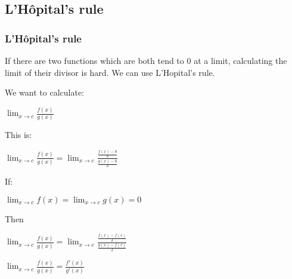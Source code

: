
\subsection{L'Hôpital's rule}

\subsubsection{L'Hôpital's rule}

If there are two functions which are both tend to \(0\) at a limit, calculating the limit of their divisor is hard. We can use L'Hopital's rule.

We want to calculate:

$\lim_{x\rightarrow c}\frac{f(x)}{g(x)}$

This is:

$\lim_{x\rightarrow c}\frac{f(x)}{g(x)}=\lim_{x\rightarrow c}\frac{\frac{f(x)-0}{\delta}}{\frac{g(x)-0}{\delta}}$

If:

$\lim_{x\rightarrow c}f(x)=\lim_{x\rightarrow c}g(x)=0$

Then

$\lim_{x\rightarrow c}\frac{f(x)}{g(x)}=\lim_{x\rightarrow c}\frac{\frac{f(x)-f(c)}{\delta}}{\frac{g(x)-f(c)}{\delta}}$

$\lim_{x\rightarrow c}\frac{f(x)}{g(x)}=\frac{f'(x)}{g'(x)}$

